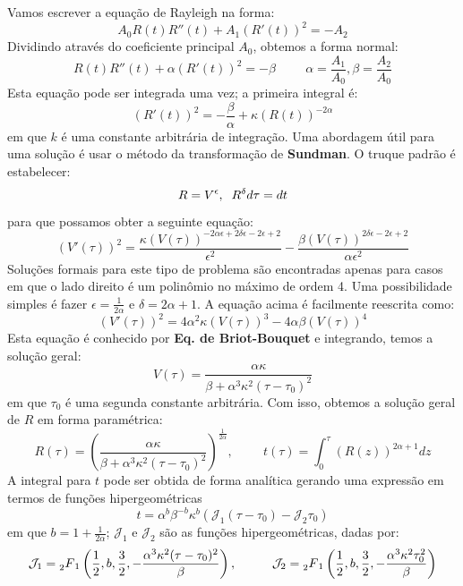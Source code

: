 \documentclass[10pt,a4paper]{article}
\begin{document}
	Vamos escrever a equação de Rayleigh na forma: \[A_0R(t)R''(t)+A_1(R'(t))^2 = -A_2\]
	Dividindo através do coeficiente principal $A_0$, obtemos a forma normal: \[R(t)R''(t)+\alpha(R'(t))^2 = -\beta\hspace{1cm}\alpha=\frac{A_1}{A_0},\beta=\frac{A_2}{A_0}\]
	Esta equação pode ser integrada uma vez; a primeira integral é:
	\begin{equation}
		(R'(t))^2 = -\frac{\beta}{\alpha} + \kappa(R(t))^{-2\alpha}
		\label{eq:1}
	\end{equation}
	em que $k$ é uma constante arbitrária de integração. Uma abordagem útil para uma solução é usar o método da transformação de \textbf{Sundman}. O truque padrão é estabelecer:
	\[R = V^\epsilon, \hspace{0.2cm} R^\delta d\tau = dt\]
	para que possamos obter a seguinte equação:
	\[(V'(\tau))^2 = \frac{\kappa(V(\tau))^{-2\alpha\epsilon+2\delta\epsilon-2\epsilon+2}}{\epsilon^2} - \frac{\beta(V(\tau))^{2\delta\epsilon-2\epsilon+2}}{\alpha\epsilon^2}\]
	Soluções formais para este tipo de problema são encontradas apenas para casos em que o lado direito é um polinômio no máximo de ordem 4. Uma possibilidade simples é fazer $\epsilon=\frac{1}{2\alpha}$ e $\delta=2\alpha+1$. A equação acima é facilmente reescrita como:
	\[(V'(\tau))^2 = 4\alpha^2\kappa(V(\tau))^3 - 4\alpha\beta(V(\tau))^4\]
	Esta equação é conhecido por \textbf{Eq. de Briot-Bouquet} e integrando, temos a solução geral:
	\[V(\tau) = \frac{\alpha\kappa}{\beta+\alpha^3\kappa^2(\tau-\tau_0)^2}\]
	em que $\tau_0$ é uma segunda constante arbitrária. Com isso, obtemos a solução geral de $R$ em forma paramétrica:
	\begin{equation}
	R(\tau) = \left(\frac{\alpha\kappa}{\beta+\alpha^3\kappa^2(\tau-\tau_0)^2}\right)^{\frac{1}{2\alpha}}, \hspace{1cm} t(\tau) = \int_0^\tau{(R(z))^{2\alpha+1} dz}
		\label{eq:3}
	\end{equation}
	A integral para $t$ pode ser obtida de forma analítica gerando uma expressão em termos de funções hipergeométricas
	\[t=\alpha^b\beta^{-b}\kappa^b\left(\mathcal{J}_1(\tau-\tau_0) - \mathcal{J}_2\tau_0\right)\]
	em que $b=1+\frac{1}{2\alpha}$; $\mathcal{J}_1$ e $\mathcal{J}_2$ são as funções hipergeométricas, dadas por:
	\[\mathcal{J}_1 = \prescript{}{2}{F}_1\left(\frac{1}{2}, b, \frac{3}{2}, -\frac{\alpha^3\kappa^2(\tau-\tau_0)^2}{\beta}\right), \hspace{1cm} \mathcal{J}_2 = \prescript{}{2}{F}_1\left(\frac{1}{2}, b, \frac{3}{2}, -\frac{\alpha^3\kappa^2\tau_0^2}{\beta}\right)\]
\end{document}
